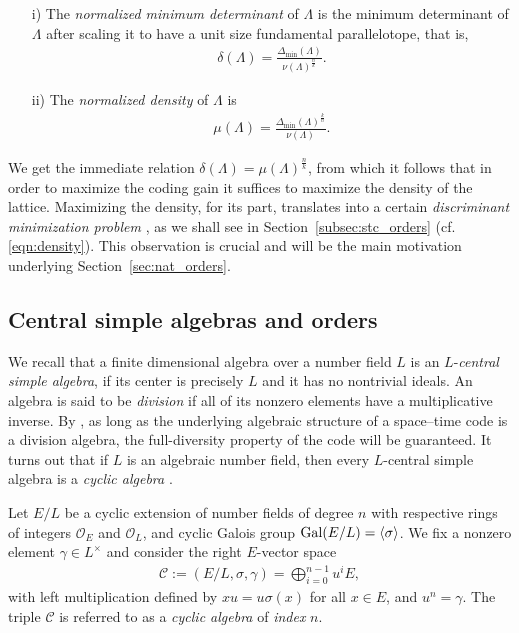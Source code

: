\documentclass[smallextended]{svjour3}
\newcommand{\mcc}{\mathcal{C}}
\newcommand{\G}{{\rm Gal}}
\newcommand{\Or}{\mathcal{O}}
\begin{document}
\begin{itemize}
	\item[i)] The \emph{normalized minimum determinant} \cite{VHLR} of $\Lambda$ is the  minimum determinant of $\Lambda$ after scaling it to have a unit size fundamental parallelotope, that is,
		\begin{align*}
			\delta(\Lambda) = \frac{\Delta_{\min}(\Lambda)}{\nu(\Lambda)^{\frac{n}{k}}}. 
		\end{align*}
	\item[ii)] The \emph{normalized density} \cite{VHLR} of $\Lambda$ is 
		\begin{align}
		\label{eqn:norm_density}
			\mu(\Lambda) = \frac{\Delta_{\min}(\Lambda)^{\frac{k}{n}}}{\nu(\Lambda)}. 
		\end{align}
\end{itemize}

We  get the immediate relation $\delta(\Lambda) = \mu(\Lambda)^{{\frac{n}{k}}}$, from which it follows that in order to maximize the coding gain it suffices to maximize the density of the lattice. Maximizing the density, for its part, translates into a certain \emph{discriminant minimization problem} \cite{VHLR,HL}, as we shall see in Section~\ref{subsec:stc_orders} (cf. \eqref{eqn:density}). This observation is crucial and will be the main motivation underlying Section~\ref{sec:nat_orders}. 


\subsection{Central simple algebras and orders}

We recall that a finite dimensional algebra  over a number field $L$ is an $L$-\emph{central simple algebra}, if its center is precisely $L$ and it has no nontrivial ideals. 
An algebra is said to be \emph{division} if all of its nonzero elements have a multiplicative inverse.
By \cite[Prop.~1]{SRS}, as long as the underlying algebraic structure of a space--time code is a division algebra, the full-diversity property of the code  will be guaranteed.
It turns out that if  $L$ is an algebraic number field, then every $L$-central simple algebra is a \emph{cyclic algebra} \cite[Thm.~32.20]{Re}. 

Let $E/L$ be a cyclic extension of number fields of degree $n$ with respective rings of integers $\Or_E$ and $\Or_L$, and cyclic Galois group $\G(E/L) = \langle \sigma \rangle$. We fix a nonzero element $\gamma\in L^\times$ and consider the right $E$-vector space
\begin{align*}
	\mcc := (E/L,\sigma,\gamma) = \bigoplus_{i = 0}^{n-1}u^i E,
\end{align*}
with left multiplication defined by $xu= u\sigma(x)$ for all $ x\in E$, and $u^n=\gamma$. The triple $\mcc$ is referred to as a \emph{cyclic algebra} of \emph{index} $n$.
\end{document}
